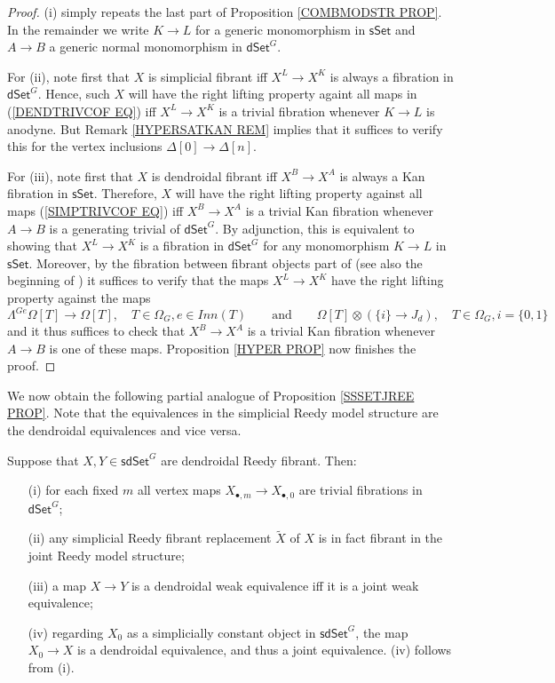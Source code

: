 \documentclass[a4paper,10pt,draft]{article}%
\numberwithin{equation}{section}%
\begin{document}
\begin{proof}
	(i) simply repeats the last part of Proposition \ref{COMBMODSTR PROP}. In the remainder we write $K \to L$ for a generic monomorphism in 
$\mathsf{sSet}$
and $A \to B$ a generic normal monomorphism in $\mathsf{dSet}^G$.

	For (ii), note first that $X$ is simplicial fibrant iff 
$X^L \to X^K$ is always a fibration in $\mathsf{dSet}^G$. 
Hence, such $X$ will have the right lifting property againt all maps in (\ref{DENDTRIVCOF EQ}) iff 
$X^L \to X^K$ is a trivial fibration whenever $K \to L$ is anodyne. But Remark \ref{HYPERSATKAN REM}
implies that it suffices to verify this for
the vertex inclusions $\Delta[0] \to \Delta[n]$.

For (iii), note first that $X$ is dendroidal fibrant iff $X^B \to X^A$ is always a Kan fibration in $\mathsf{sSet}$.
Therefore, $X$ will have the right lifting property against all maps (\ref{SIMPTRIVCOF EQ}) iff 
$X^B \to X^A$ is a trivial Kan fibration whenever $A\to B$ is a generating trivial of $\mathsf{dSet}^G$.
By adjunction, this is equivalent to showing that
$X^L \to X^K$ is a fibration in $\mathsf{dSet}^G$ for any monomorphism $K \to L$ in $\mathsf{sSet}$. Moreover, by the fibration between fibrant objects part of \cite[Prop. 8.8]{Per17}
(see also the beginning of \cite[\S 8.1]{Per17})
it suffices to verify that the maps $X^L \to X^K$ have the right lifting property against the maps
\[
	\Lambda^{G e} \Omega[T] \to \Omega[T],
	\quad
	T \in \Omega_G, e \in Inn(T)
\qquad
\text{and}
\qquad
	\Omega[T] \otimes \left( \{i\} \to J_d\right),
	\quad
	T \in \Omega_G, i = \{0,1\}
\]
and it thus suffices to check that $X^B \to X^A$ is a trivial Kan fibration whenever $A\to B$ is one of these maps.
Proposition \ref{HYPER PROP} now finishes the proof.
\end{proof}

We now obtain the following partial analogue of Proposition \ref{SSSETJREE PROP}. Note that the equivalences in the simplicial Reedy model structure are the dendroidal equivalences and vice versa.

\begin{corollary}\label{SDSETG COR}
	Suppose that $X, Y \in \mathsf{sdSet}^G$ are dendroidal Reedy fibrant. Then:
\begin{itemize}
	\item[(i)] for each fixed $m$ all vertex maps $X_{\bullet,m} \to X_{\bullet,0}$ are trivial fibrations in $\mathsf{dSet}^G$;
	\item[(ii)] any simplicial Reedy fibrant replacement $\tilde{X}$ of $X$ is in fact fibrant in the joint Reedy model structure;
	\item[(iii)] a map $X \to Y$ is a dendroidal weak equivalence iff it is a joint weak equivalence;
	\item[(iv)] regarding $X_0$ as a simplicially constant object in $\mathsf{sdSet}^G$, the map $X_0 \to X$ is a dendroidal equivalence, and thus a joint equivalence. (iv) follows from (i).
\end{itemize}
\end{corollary}
\end{document}
